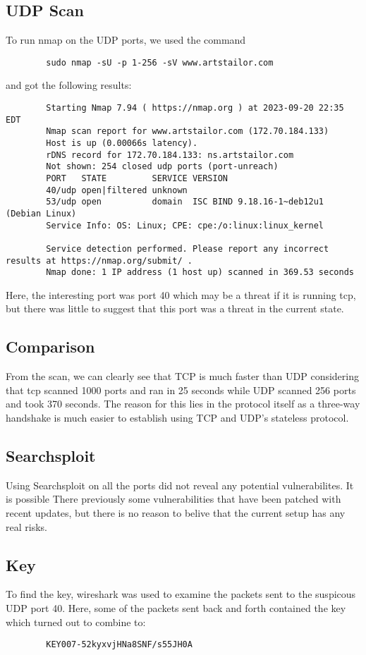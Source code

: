 \documentclass[notitlepage]{article}
\begin{document}
\subsection{UDP Scan}
    To run nmap on the UDP ports, we used the command
    \begin{verbatim}
        sudo nmap -sU -p 1-256 -sV www.artstailor.com
    \end{verbatim}
    and got the following results:
     \begin{verbatim}
        Starting Nmap 7.94 ( https://nmap.org ) at 2023-09-20 22:35 EDT
        Nmap scan report for www.artstailor.com (172.70.184.133)
        Host is up (0.00066s latency).
        rDNS record for 172.70.184.133: ns.artstailor.com
        Not shown: 254 closed udp ports (port-unreach)
        PORT   STATE         SERVICE VERSION
        40/udp open|filtered unknown
        53/udp open          domain  ISC BIND 9.18.16-1~deb12u1 (Debian Linux)
        Service Info: OS: Linux; CPE: cpe:/o:linux:linux_kernel

        Service detection performed. Please report any incorrect results at https://nmap.org/submit/ .
        Nmap done: 1 IP address (1 host up) scanned in 369.53 seconds    
     \end{verbatim}
    Here, the interesting port was port 40 which may be a threat if it is running tcp, but there was little
    to suggest that this port was a threat in the current state.

\subsection{Comparison}
    From the scan, we can clearly see that TCP is much faster than UDP considering that tcp scanned
    1000 ports and ran in 25 seconds while UDP scanned 256 ports and took 370 seconds. The reason
    for this lies in the protocol itself as a three-way handshake is much easier to establish
    using TCP and UDP's stateless protocol.

\subsection{Searchsploit}
    Using Searchsploit on all the ports did not reveal any potential vulnerabilites. It is possible
    There previously some vulnerabilities that have been patched with recent updates, but 
    there is no reason to belive that the current setup has any real risks.

\subsection{Key}
    To find the key, wireshark was used to examine the packets sent to the suspicous UDP port 40.
    Here, some of the packets sent back and forth contained the key which turned out to combine to:
    \begin{verbatim}
        KEY007-52kyxvjHNa8SNF/s55JH0A
    \end{verbatim}
	
\end{document}
